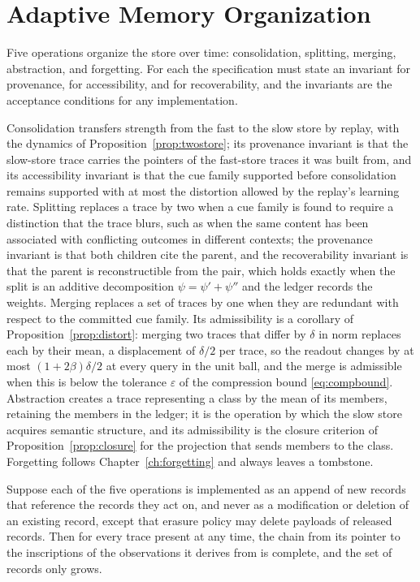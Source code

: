 \chapter{Adaptive Memory Organization}\label{ch:adaptive}

Five operations organize the store over time: consolidation, splitting, merging, abstraction, and forgetting. For each the specification must state an invariant for provenance, for accessibility, and for recoverability, and the invariants are the acceptance conditions for any implementation.

Consolidation transfers strength from the fast to the slow store by replay, with the dynamics of Proposition~\ref{prop:twostore}; its provenance invariant is that the slow-store trace carries the pointers of the fast-store traces it was built from, and its accessibility invariant is that the cue family supported before consolidation remains supported with at most the distortion allowed by the replay's learning rate. Splitting replaces a trace by two when a cue family is found to require a distinction that the trace blurs, such as when the same content has been associated with conflicting outcomes in different contexts; the provenance invariant is that both children cite the parent, and the recoverability invariant is that the parent is reconstructible from the pair, which holds exactly when the split is an additive decomposition $\psi=\psi'+\psi''$ and the ledger records the weights. Merging replaces a set of traces by one when they are redundant with respect to the committed cue family. Its admissibility is a corollary of Proposition~\ref{prop:distort}: merging two traces that differ by $\delta$ in norm replaces each by their mean, a displacement of $\delta/2$ per trace, so the readout changes by at most $(1+2\beta)\delta/2$ at every query in the unit ball, and the merge is admissible when this is below the tolerance $\varepsilon$ of the compression bound \eqref{eq:compbound}. Abstraction creates a trace representing a class by the mean of its members, retaining the members in the ledger; it is the operation by which the slow store acquires semantic structure, and its admissibility is the closure criterion of Proposition~\ref{prop:closure} for the projection that sends members to the class. Forgetting follows Chapter~\ref{ch:forgetting} and always leaves a tombstone.

\begin{proposition}\label{prop:provinv}
Suppose each of the five operations is implemented as an append of new records that reference the records they act on, and never as a modification or deletion of an existing record, except that erasure policy may delete payloads of released records. Then for every trace present at any time, the chain from its pointer to the inscriptions of the observations it derives from is complete, and the set of records only grows.
\end{proposition}


